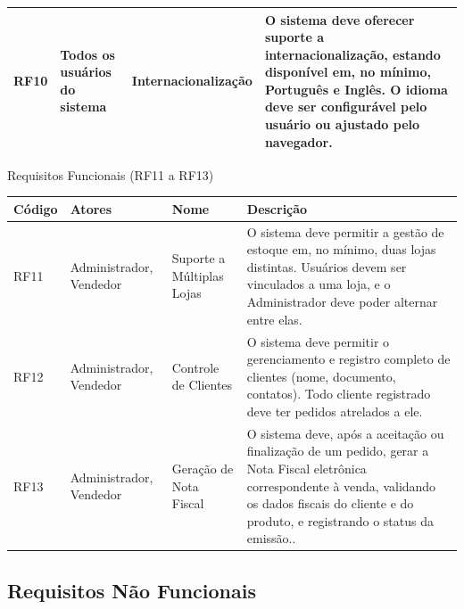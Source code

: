 \documentclass[
	12pt,				%
	openany,			%
	twoside,			%
	a4paper,			%
	english,			%
	brazil				%
	]{abntex2}
\begin{document}
\begin{quadro}[htb]
\begin{tabular}{|p{1.4cm}|p{2.8cm}|p{4.5cm}|p{7.0cm}|}
    RF10 & Todos os usuários do sistema & Internacionalização & O sistema deve oferecer suporte a internacionalização, estando disponível em, no mínimo, Português e Inglês. O idioma deve ser configurável pelo usuário ou ajustado pelo navegador. \\ \hline

    

    

    

\end{tabular}
\end{quadro}

\FloatBarrier

\begin{quadro}[htb]
\caption{\label{quadro_rf3}Requisitos Funcionais (RF11 a RF13)}
\hspace*{-1cm}
\begin{tabular}{|p{1.4cm}|p{2.8cm}|p{4.5cm}|p{7.0cm}|}
    \hline
    \textbf{Código} & \textbf{Atores} & \textbf{Nome} & \textbf{Descrição} \\ \hline

   RF11 & Administrador, Vendedor & Suporte a Múltiplas Lojas & O sistema deve permitir a gestão de estoque em, no mínimo, duas lojas distintas. Usuários devem ser vinculados a uma loja, e o Administrador deve poder alternar entre elas. \\ \hline

    RF12 & Administrador, Vendedor & Controle de Clientes & O sistema deve permitir o gerenciamento e registro completo de clientes (nome, documento, contatos). Todo cliente registrado deve ter pedidos atrelados a ele. \\ \hline

 RF13 & Administrador, Vendedor & Geração de Nota Fiscal & O sistema deve, após a aceitação ou finalização de um pedido, gerar a Nota Fiscal eletrônica correspondente à venda, validando os dados fiscais do cliente e do produto, e registrando o status da emissão.. \\ \hline

  

\end{tabular}
\end{quadro}

\FloatBarrier


\subsection{Requisitos Não Funcionais}
\end{document}
